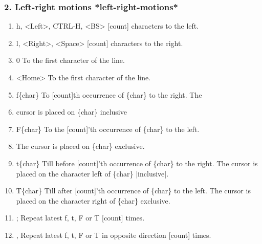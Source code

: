 \documentclass{beamer}
\begin{document}
\begin{frame}
  \frametitle{2. Left-right motions                 *left-right-motions*}

  \begin{enumerate}
    \item h, <Left>, CTRL-H, <BS>           [count] characters to the left.
    \item l, <Right>, <Space>           [count] characters to the right.
    \item 0         To the first character of the line.
    \item <Home>            To the first character of the line.
    \item f\{char\}         To [count]th occurrence of \{char\} to the right.  The
    \item           cursor is placed on \{char\} inclusive
    \item F\{char\}         To the [count]'th occurrence of \{char\} to the left.
    \item           The cursor is placed on \{char\} exclusive.
    \item t\{char\}         Till before [count]'th occurrence of \{char\} to the
      right.  The cursor is placed on the character left of
      \{char\} |inclusive|.
    \item T\{char\}         Till after [count]'th occurrence of \{char\} to the left.  The cursor is placed on the character right of \{char\} exclusive.
    \item ;         Repeat latest f, t, F or T [count] times.
    \item ,         Repeat latest f, t, F or T in opposite direction [count] times.
  \end{enumerate}
\end{frame}
\end{document}
